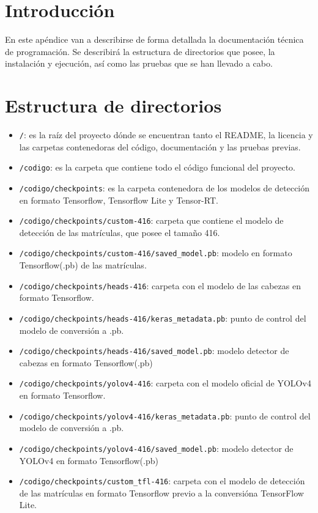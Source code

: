 
\section{Introducción}
En este apéndice van a describirse de forma detallada la documentación técnica de programación. Se describirá la estructura de directorios que posee, la instalación y ejecución, así como las pruebas que se han llevado a cabo. 
\section{Estructura de directorios}
\begin{itemize}
    \tightlist
    \item \texttt{/}: es la raíz del proyecto dónde se encuentran tanto el README, la licencia y las carpetas contenedoras del código, documentación y las pruebas previas.
    \item \texttt{/codigo}: es la carpeta que contiene todo el código funcional del proyecto.
    \item \texttt{/codigo/checkpoints}: es la carpeta contenedora de los modelos de detección en formato Tensorflow, Tensorflow Lite y Tensor-RT.
    \item \texttt{/codigo/checkpoints/custom-416}: carpeta que contiene el modelo de detección de las matrículas, que posee el tamaño 416.
    \item \texttt{/codigo/checkpoints/custom-416/saved\_model.pb}: modelo en formato Tensorflow(.pb) de las matrículas.
    \item \texttt{/codigo/checkpoints/heads-416}: carpeta con el modelo de las cabezas en formato Tensorflow.
    \item \texttt{/codigo/checkpoints/heads-416/keras\_metadata.pb}: punto de control del modelo de conversión a .pb.
    \item \texttt{/codigo/checkpoints/heads-416/saved\_model.pb}: modelo detector de cabezas en formato Tensorflow(.pb)
    \item \texttt{/codigo/checkpoints/yolov4-416}: carpeta con el modelo oficial de YOLOv4 en formato Tensorflow.
    \item \texttt{/codigo/checkpoints/yolov4-416/keras\_metadata.pb}: punto de control del modelo de conversión a .pb.
    \item \texttt{/codigo/checkpoints/yolov4-416/saved\_model.pb}: modelo detector de YOLOv4 en formato Tensorflow(.pb)
    \item \texttt{/codigo/checkpoints/custom\_tfl-416}: carpeta con el modelo de detección de las matrículas en formato Tensorflow previo a la conversióna TensorFlow Lite.

\end{itemize}
